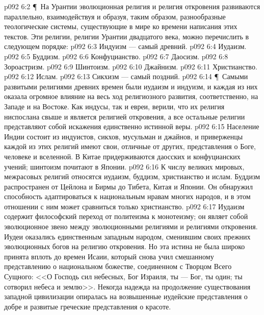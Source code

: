 \vs p092 6:2 \P\ На Урантии эволюционная религия и религия откровения развиваются параллельно, взаимодействуя и образуя, таким образом, разнообразные теологические системы, существующие в мире ко времени написания этих текстов. Эти религии, религии Урантии двадцатого века, можно перечислить в следующем порядке:
\vs p092 6:3 \bibnobreakspace Индуизм --- самый древний.
\vs p092 6:4 \bibnobreakspace Иудаизм.
\vs p092 6:5 \bibnobreakspace Буддизм.
\vs p092 6:6 \bibnobreakspace Конфуцианство.
\vs p092 6:7 \bibnobreakspace Даосизм.
\vs p092 6:8 \bibnobreakspace Зороастризм.
\vs p092 6:9 \bibnobreakspace Шинтоизм.
\vs p092 6:10 \bibnobreakspace Джайнизм.
\vs p092 6:11 \bibnobreakspace Христианство.
\vs p092 6:12 \bibnobreakspace Ислам.
\vs p092 6:13 \bibnobreakspace Сикхизм --- самый поздний.
\vs p092 6:14 \P\ Самыми развитыми религиями древних времен были иудаизм и индуизм, и каждая из них оказала огромное влияние на весь ход религиозного развития, соответственно, на Западе и на Востоке. Как индусы, так и евреи, верили, что их религия ниспослана свыше и является религией откровения, а все остальные религии представляют собой искажения единственно истинной веры.
\vs p092 6:15 Население Индии состоит из индуистов, сикхов, мусульман и джайнов, и приверженцы каждой из этих религий имеют свои, отличные от других, представления о Боге, человеке и вселенной. В Китае придерживаются даосских и конфуцианских учений; шинтоизм почитают в Японии.
\vs p092 6:16 К числу великих мировых, межрасовых религий относятся иудаизм, буддизм, христианство и ислам. Буддизм распространен от Цейлона и Бирмы до Тибета, Китая и Японии. Он обнаружил способность адаптироваться к национальным нравам многих народов, и в этом отношении с ним может сравниться только христианство.
\vs p092 6:17 Иудаизм содержит философский переход от политеизма к монотеизму; он являет собой эволюционное звено между эволюционными религиями и религиями откровения. Иудеи оказались единственным западным народом, сменившим своих прежних эволюционных богов на религию откровения. Но эта истина не была широко принята вплоть до времен Исаии, который снова учил смешанному представлению о национальном божестве, соединенном с Творцом Всего Сущного: <<О Господь сил небесных, Бог Израиля, ты --- Бог, ты один; ты сотворил небеса и землю>>. Некогда надежда на продолжение существования западной цивилизации опиралась на возвышенные иудейские представления о добре и развитые греческие представления о красоте.
